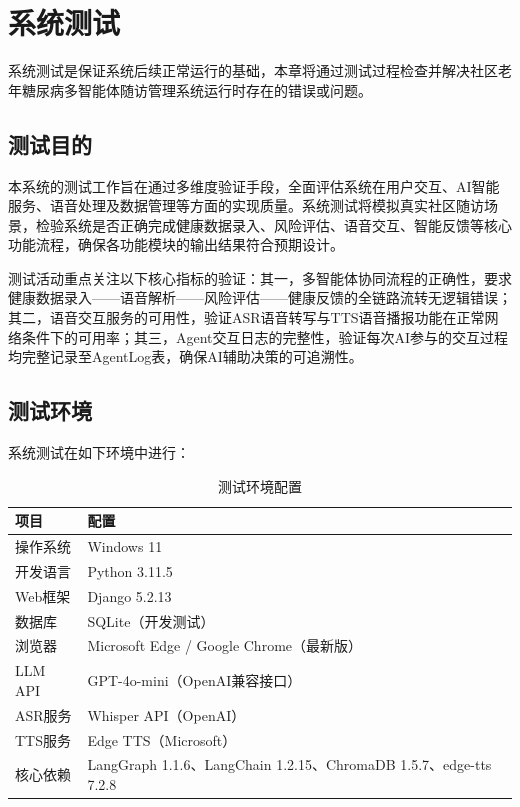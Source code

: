 \chapter{系统测试}

系统测试是保证系统后续正常运行的基础，本章将通过测试过程检查并解决社区老年糖尿病多智能体随访管理系统运行时存在的错误或问题。

\section{测试目的}

本系统的测试工作旨在通过多维度验证手段，全面评估系统在用户交互、AI智能服务、语音处理及数据管理等方面的实现质量。系统测试将模拟真实社区随访场景，检验系统是否正确完成健康数据录入、风险评估、语音交互、智能反馈等核心功能流程，确保各功能模块的输出结果符合预期设计。

测试活动重点关注以下核心指标的验证：其一，多智能体协同流程的正确性，要求健康数据录入——语音解析——风险评估——健康反馈的全链路流转无逻辑错误；其二，语音交互服务的可用性，验证ASR语音转写与TTS语音播报功能在正常网络条件下的可用率；其三，Agent交互日志的完整性，验证每次AI参与的交互过程均完整记录至AgentLog表，确保AI辅助决策的可追溯性。

\section{测试环境}

系统测试在如下环境中进行：

\begin{table}[H]
\centering
\caption{测试环境配置}
\label{tab:test-env}
\begin{tabularx}{\textwidth}{|l|X|}
\hline
\textbf{项目} & \textbf{配置} \\
\hline
操作系统 & Windows 11 \\
\hline
开发语言 & Python 3.11.5 \\
\hline
Web框架 & Django 5.2.13 \\
\hline
数据库 & SQLite（开发测试） \\
\hline
浏览器 & Microsoft Edge / Google Chrome（最新版） \\
\hline
LLM API & GPT-4o-mini（OpenAI兼容接口） \\
\hline
ASR服务 & Whisper API（OpenAI） \\
\hline
TTS服务 & Edge TTS（Microsoft） \\
\hline
核心依赖 & LangGraph 1.1.6、LangChain 1.2.15、ChromaDB 1.5.7、edge-tts 7.2.8 \\
\hline
\end{tabularx}
\end{table}

